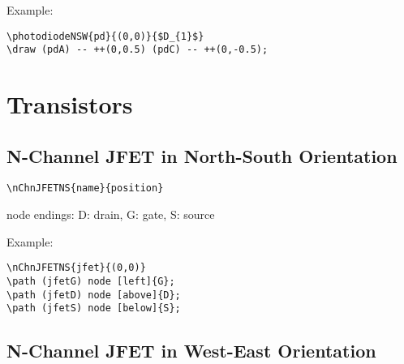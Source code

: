 \documentclass[parskip=full]{scrartcl}
\begin{document}
Example:\\
\begin{minipage}{0.8\textwidth}
\begin{verbatim}
\photodiodeNSW{pd}{(0,0)}{$D_{1}$}
\draw (pdA) -- ++(0,0.5) (pdC) -- ++(0,-0.5);
\end{verbatim}
\end{minipage}
\begin{minipage}{0.19\textwidth}
\end{minipage}

\section{Transistors}

\subsection{N-Channel JFET in North-South Orientation}

\begin{verbatim}
\nChnJFETNS{name}{position}
\end{verbatim}
node endings: D: drain, G: gate, S: source

Example:\\
\begin{minipage}{0.8\textwidth}
\begin{verbatim}
\nChnJFETNS{jfet}{(0,0)}
\path (jfetG) node [left]{G};
\path (jfetD) node [above]{D};
\path (jfetS) node [below]{S};
\end{verbatim}
\end{minipage}
\begin{minipage}{0.19\textwidth}
\end{minipage}

\subsection{N-Channel JFET in West-East Orientation}
\end{document}
